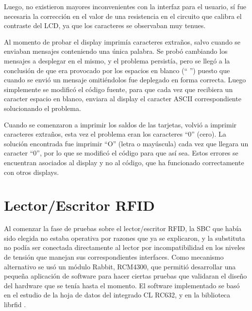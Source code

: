 \bigskip
Luego, no existieron mayores inconvenientes con la interfaz para el usuario, sí fue 
necesaria la corrección en el valor de una resistencia en el circuito que calibra 
el contraste del LCD, ya que los caracteres se observaban muy tenues.

\bigskip
Al momento de probar el display imprimía caracteres extraños, salvo cuando se enviaban mensajes conteniendo una única palabra. Se probó cambiando los mensajes a desplegar en el mismo, y el problema persistía, pero se llegó a la conclusión de que era provocado por los espacios en blanco (“ ”) puesto que cuando se envió un mensaje omitiéndolos fue deplegado en forma correcta. Luego simplemente se modificó el código fuente, para que cada vez que recibiera un caracter espacio en blanco, enviara al display el caracter ASCII correspondiente solucionando el problema.

Cuando se comenzaron a imprimir los saldos de las tarjetas, volvió a imprimir caracteres extraños, esta vez el problema eran los caracteres “0” (cero). La solución encontrada fue imprimir “O” (letra o mayúscula) cada vez que llegara un caracter “0”, por lo que se modificó el código para que así sea.
Estos errores se encuentran asociados al display y no al código, que ha funcionado correctamente con otros displays.


\section{Lector/Escritor RFID}
Al comenzar la fase de pruebas sobre el lector/escritor RFID, la SBC que había sido elegida no estaba operativa por razones que ya se explicaron, y la substituta no podía ser conectada directamente al lector por incompatibilidad en los niveles de tensión que manejan sus correspondientes interfaces. Como mecanismo alternativo se usó un módulo Rabbit, RCM4300, que permitió desarrollar una pequeña aplicación de software para hacer ciertas pruebas que validaran el diseño del hardware que se tenía hasta el momento. El software implementado se basó en el estudio de la hoja de datos del integrado CL RC632, y en la biblioteca librfid \cite{librfid}. 



